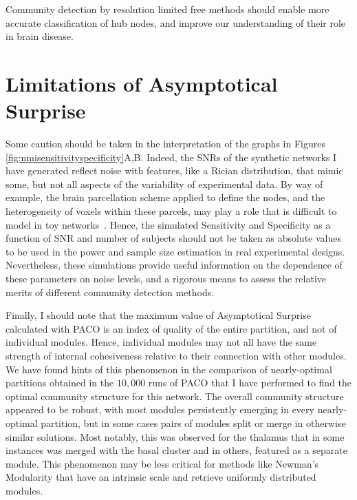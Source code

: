 Community detection by resolution limited free methods should enable more accurate classification of hub nodes, and improve our understanding of their role in brain disease.


\section{Limitations of Asymptotical Surprise}
Some caution should be taken in the interpretation of the graphs in Figures \ref{fig:nmisensitivityspecificity}A,B.
Indeed, the SNRs of the synthetic networks I have generated reflect noise with features, like a Rician distribution, that mimic some, but not all aspects of the variability of experimental data.
By way of example, the brain parcellation scheme applied to define the nodes, and the heterogeneity of voxels within these parcels, may play a role that is difficult to model in toy networks~\cite{fornito2010}.
Hence, the simulated Sensitivity and Specificity as a function of SNR and number of subjects should not be taken as absolute values to be used in the power and sample size estimation in real experimental designs.
Nevertheless, these simulations provide useful information on the dependence of these parameters on noise levels, and a rigorous means to assess the relative merits of different community detection methods.

Finally, I should note that the maximum value of Asymptotical Surprise calculated with PACO is an index of quality of the entire partition, and not of individual modules.
Hence, individual modules may not all have the same strength of internal cohesiveness relative to their connection with other modules.
We have found hints of this phenomenon in the comparison of nearly-optimal partitions obtained in the $10,000$ runs of PACO that I have performed to find the optimal community structure for this network.
The overall community structure appeared to be robust, with most modules persistently emerging in every nearly-optimal partition, but in some cases pairs of modules split or merge in otherwise similar solutions.
Most notably, this was observed for the thalamus that in some instances was merged with the basal cluster and in others, featured as a separate module.
This phenomenon may be less critical for methods like Newman's Modularity that have an intrinsic scale and retrieve uniformly distributed modules.

